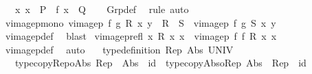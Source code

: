 \begin{isabellebody}
\ \ \ {\isacharparenleft}{\kern0pt}{\isasymAnd}x{\isachardot}{\kern0pt}\ x\ {\isasymin}\ P\ {\isasymLongrightarrow}\ f\ x\ {\isasymin}\ Q{\isacharparenright}{\kern0pt}{\isachardoublequoteclose}\isanewline
%
\isadelimproof
\ \ %
\endisadelimproof
%
\isatagproof
{}\isamarkupfalse%
\ Grp{\isacharunderscore}{\kern0pt}def\ \isamarkupfalse%
\ rule\ auto%
\endisatagproof
{\isafoldproof}%
%
\isadelimproof
\isanewline
%
\endisadelimproof
\isanewline
{}\isamarkupfalse%
\ vimage{}p{\isacharunderscore}{\kern0pt}mono{\isacharcolon}{\kern0pt}\ {\isachardoublequoteopen}vimage{}p\ f\ g\ R\ x\ y\ {\isasymLongrightarrow}\ R\ {\isasymle}\ S\ {\isasymLongrightarrow}\ vimage{}p\ f\ g\ S\ x\ y{\isachardoublequoteclose}\isanewline
%
\isadelimproof
\ \ %
\endisadelimproof
%
\isatagproof
{}\isamarkupfalse%
\ vimage{}p{\isacharunderscore}{\kern0pt}def\ \isamarkupfalse%
\ blast%
\endisatagproof
{\isafoldproof}%
%
\isadelimproof
\isanewline
%
\endisadelimproof
\isanewline
{}\isamarkupfalse%
\ vimage{}p{\isacharunderscore}{\kern0pt}refl{\isacharcolon}{\kern0pt}\ {\isachardoublequoteopen}{\isacharparenleft}{\kern0pt}{\isasymAnd}x{\isachardot}{\kern0pt}\ R\ x\ x{\isacharparenright}{\kern0pt}\ {\isasymLongrightarrow}\ vimage{}p\ f\ f\ R\ x\ x{\isachardoublequoteclose}\isanewline
%
\isadelimproof
\ \ %
\endisadelimproof
%
\isatagproof
{}\isamarkupfalse%
\ vimage{}p{\isacharunderscore}{\kern0pt}def\ \isamarkupfalse%
\ auto%
\endisatagproof
{\isafoldproof}%
%
\isadelimproof
\isanewline
%
\endisadelimproof
\isanewline
{}\isamarkupfalse%
\isanewline
\ \ \ {\isachardoublequoteopen}type{\isacharunderscore}{\kern0pt}definition\ Rep\ Abs\ UNIV{\isachardoublequoteclose}\isanewline
\ \ \ type{\isacharunderscore}{\kern0pt}copy{\isacharunderscore}{\kern0pt}Rep{\isacharunderscore}{\kern0pt}o{\isacharunderscore}{\kern0pt}Abs{\isacharcolon}{\kern0pt}\ {\isachardoublequoteopen}Rep\ {\isasymcirc}\ Abs\ {\isacharequal}{\kern0pt}\ id{\isachardoublequoteclose}\ \ type{\isacharunderscore}{\kern0pt}copy{\isacharunderscore}{\kern0pt}Abs{\isacharunderscore}{\kern0pt}o{\isacharunderscore}{\kern0pt}Rep{\isacharcolon}{\kern0pt}\ {\isachardoublequoteopen}Abs\ {\isasymcirc}\ Rep\ {\isacharequal}{\kern0pt}\ id{\isachardoublequoteclose}\isanewline
%
\isadelimproof
\ \ %
\endisadelimproof
%
\isatagproof
{}\isamarkupfalse%

\end{isabellebody}
